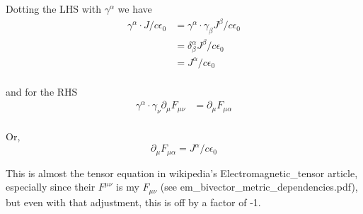 \documentclass{article}
\begin{document}
Dotting the LHS with $\gamma^{\alpha}$ we have
\begin{align*}
\gamma^{\alpha} \cdot J/c \epsilon_0 
&= \gamma^{\alpha} \cdot \gamma_{\beta }J^{\beta}/c \epsilon_0 \\
&= \delta^{\alpha}_{\beta }J^{\beta}/c \epsilon_0 \\
&= J^{\alpha}/c \epsilon_0 \\
\end{align*}

and for the RHS 
\begin{align*}
\gamma^{\alpha} \cdot \gamma_{\nu} \partial_{\mu} F_{\mu\nu}
&= \partial_{\mu} F_{\mu\alpha} \\
\end{align*}

Or,
\begin{equation}
\partial_{\mu} F_{\mu\alpha} = J^{\alpha}/c \epsilon_0
\end{equation}

This is almost the tensor equation in wikipedia's Electromagnetic\_tensor
article, especially since their $F^{\mu\nu}$ is my $F_{\mu\nu}$ (see em\_bivector\_metric\_dependencies.pdf),
but even with that adjustment, this is off by a factor of -1.
\end{document}
